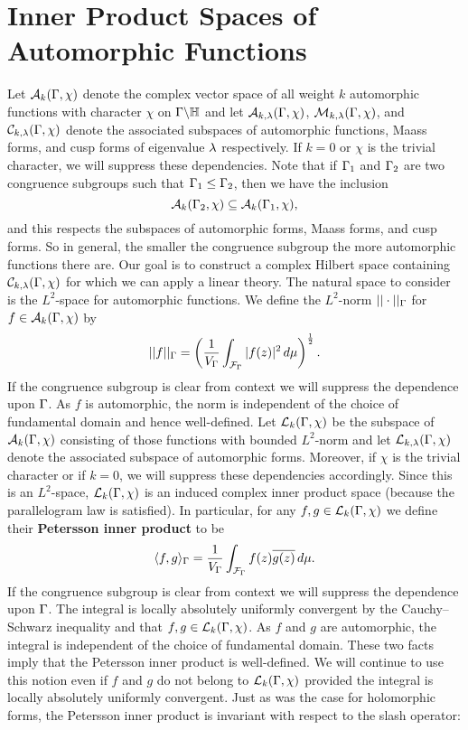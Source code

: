   \section{Inner Product Spaces of Automorphic Functions}
    Let $\mathcal{A}_{k}(\Gamma,\chi)$ denote the complex vector space of all weight $k$ automorphic functions with character $\chi$ on $\Gamma\backslash\mathbb{H}$ and let $\mathcal{A}_{k,\lambda}(\Gamma,\chi)$, $\mathcal{M}_{k,\lambda}(\Gamma,\chi)$, and $\mathcal{C}_{k,\lambda}(\Gamma,\chi)$ denote the associated subspaces of automorphic functions, Maass forms, and cusp forms of eigenvalue $\lambda$ respectively. If $k = 0$ or $\chi$ is the trivial character, we will suppress these dependencies. Note that if $\Gamma_{1}$ and $\Gamma_{2}$ are two congruence subgroups such that $\Gamma_{1} \le \Gamma_{2}$, then we have the inclusion
    \[
      \mathcal{A}_{k}(\Gamma_{2},\chi) \subseteq \mathcal{A}_{k}(\Gamma_{1},\chi),
    \]
    and this respects the subspaces of automorphic forms, Maass forms, and cusp forms. So in general, the smaller the congruence subgroup the more automorphic functions there are. Our goal is to construct a complex Hilbert space containing $\mathcal{C}_{k,\lambda}(\Gamma,\chi)$ for which we can apply a linear theory. The natural space to consider is the $L^{2}$-space for automorphic functions. We define the $L^{2}$-norm $||\cdot||_{\Gamma}$ for $f \in \mathcal{A}_{k}(\Gamma,\chi)$ by 
    \[
      ||f||_{\Gamma} = \left(\frac{1}{V_{\Gamma}}\int_{\mathcal{F}_{\Gamma}}|f(z)|^{2}\,d\mu\right)^{\frac{1}{2}}.
    \]
    If the congruence subgroup is clear from context we will suppress the dependence upon $\Gamma$. As $f$ is automorphic, the norm is independent of the choice of fundamental domain and hence well-defined. Let $\mathcal{L}_{k}(\Gamma,\chi)$ be the subspace of $\mathcal{A}_{k}(\Gamma,\chi)$ consisting of those functions with bounded $L^{2}$-norm and let $\mathcal{L}_{k,\lambda}(\Gamma,\chi)$ denote the associated subspace of automorphic forms. Moreover, if $\chi$ is the trivial character or if $k = 0$, we will suppress these dependencies accordingly. Since this is an $L^{2}$-space, $\mathcal{L}_{k}(\Gamma,\chi)$ is an induced complex inner product space (because the parallelogram law is satisfied). In particular, for any $f,g \in \mathcal{L}_{k}(\Gamma,\chi)$ we define their \textbf{Petersson inner product} to be
    \[
      \langle f,g\rangle_{\Gamma} = \frac{1}{V_{\Gamma}}\int_{\mathcal{F}_{\Gamma}}f(z)\overline{g(z)}\,d\mu.
    \]
    If the congruence subgroup is clear from context we will suppress the dependence upon $\Gamma$. The integral is locally absolutely uniformly convergent by the Cauchy–Schwarz inequality and that $f,g \in \mathcal{L}_{k}(\Gamma,\chi)$. As $f$ and $g$ are automorphic, the integral is independent of the choice of fundamental domain. These two facts imply that the Petersson inner product is well-defined. We will continue to use this notion even if $f$ and $g$ do not belong to $\mathcal{L}_{k}(\Gamma,\chi)$ provided the integral is locally absolutely uniformly convergent. Just as was the case for holomorphic forms, the Petersson inner product is invariant with respect to the slash operator:

